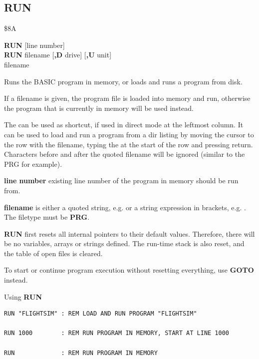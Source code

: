 
\newpage
\subsection{RUN}
\begin{description}[leftmargin=2cm,style=nextline]
\item [Token:]    \$8A

\item [Format:]   {\bf RUN} [line number] \\
                  {\bf RUN} filename [{\bf,D} drive] [{\bf,U} unit] \\
                  \megakeywhite{$\uparrow$} filename

\item [Usage:]    Runs the BASIC program in memory, or loads and runs a program from disk.

                  If a filename is given, the program file is loaded into memory and run, otherwise the program that is currently in memory will be used instead.

                  The {\bf \screentext{$\uparrow$}} can be used as shortcut, if used in direct mode at the leftmost column. It can be used to load and run a program from a dir listing by moving the cursor to the row with the filename, typing the {\bf \screentext{$\uparrow$}} at the start of the row and pressing return. Characters before and after the quoted filename will be ignored (similar to the PRG for example).

                  {\bf line number} existing line number of the program in memory should be run from.

                  {\bf filename} is either a quoted string, e.g.  or a string expression in brackets, e.g. . The filetype must be {\bf PRG}.

                  \drivedefinition

                  \unitdefinition

\item [Remarks:]  {\bf RUN} first resets all internal pointers to their default values. Therefore, there will be no variables, arrays or strings defined. The run-time stack is also reset, and the table of open files is cleared.

                  To start or continue program execution without resetting everything, use {\bf GOTO} instead.

\item [Examples:] Using {\bf RUN}

\begin{tcolorbox}[colback=black,coltext=white]
\verbatimfont{\codefont}
\begin{verbatim}
RUN "FLIGHTSIM" : REM LOAD AND RUN PROGRAM "FLIGHTSIM"

RUN 1000        : REM RUN PROGRAM IN MEMORY, START AT LINE 1000

RUN             : REM RUN PROGRAM IN MEMORY
\end{verbatim}
\end{tcolorbox}
\end{description}

